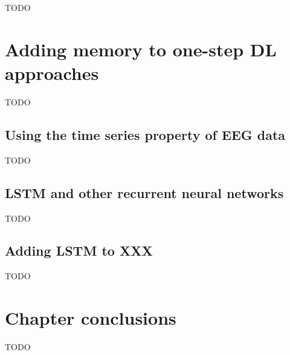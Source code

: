 TODO

\section{Adding memory to one-step DL approaches}
\label{sec:offline_bci_system_rnn}

TODO


\subsection{Using the time series property of EEG data}
\label{subsec:offline_bci_system_rnn_why_rnn}

TODO


\subsection{LSTM and other recurrent neural networks}
\label{subsec:offline_bci_system_rnn_lstm_explained}

TODO


\subsection{Adding LSTM to XXX}
\label{subsec:offline_bci_system_rnn_lstm_implementation}

TODO

\section{Chapter conclusions}
\label{sec:offline_bci_summary}

TODO